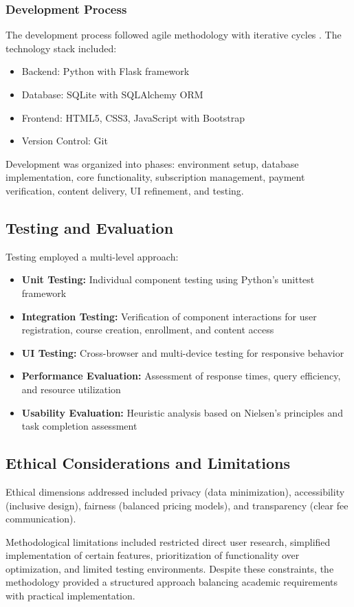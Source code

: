 \subsubsection{Development Process}

The development process followed agile methodology with iterative cycles \cite{dingsoyr2012}. The technology stack included:

\begin{itemize}
    \item Backend: Python with Flask framework
    \item Database: SQLite with SQLAlchemy ORM
    \item Frontend: HTML5, CSS3, JavaScript with Bootstrap
    \item Version Control: Git
\end{itemize}

Development was organized into phases: environment setup, database implementation, core functionality, subscription management, payment verification, content delivery, UI refinement, and testing.

\subsection{Testing and Evaluation}

Testing employed a multi-level approach:

\begin{itemize}
    \item \textbf{Unit Testing:} Individual component testing using Python's unittest framework
    
    \item \textbf{Integration Testing:} Verification of component interactions for user registration, course creation, enrollment, and content access
    
    \item \textbf{UI Testing:} Cross-browser and multi-device testing for responsive behavior
    
    \item \textbf{Performance Evaluation:} Assessment of response times, query efficiency, and resource utilization
    
    \item \textbf{Usability Evaluation:} Heuristic analysis based on Nielsen's principles \cite{nielsen1994} and task completion assessment
\end{itemize}

\subsection{Ethical Considerations and Limitations}

Ethical dimensions addressed included privacy (data minimization), accessibility (inclusive design), fairness (balanced pricing models), and transparency (clear fee communication).

Methodological limitations included restricted direct user research, simplified implementation of certain features, prioritization of functionality over optimization, and limited testing environments. Despite these constraints, the methodology provided a structured approach balancing academic requirements with practical implementation.